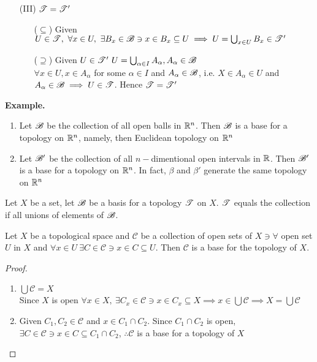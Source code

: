 \begin{enumerate}[wide]
	\item[(III)] $\mathscr{T} = \mathscr{T}'$
		\begin{enumerate}
		\item[($\subseteq$)] Given $U \in \mathscr{T},~\forall x \in U,~\exists B_x \in \mathscr{B} \ni x \in B_x \subseteq U \implies U = \bigcup_{x \in U}B_x \in \mathscr{T}'$
		\item[($\supseteq$)] Given $U \in \mathscr{T}' ~ U = \bigcup_{\alpha \in I}A_{\alpha},A_{\alpha} \in \mathscr{B}$\\
		$\forall x \in U,x \in A_{\alpha}$ for some $\alpha \in I$ and $A_{\alpha} \in \mathscr{B}$, i.e. $X \in A_{\alpha} \in U$ and $A_{\alpha} \in \mathscr{B} \implies U \in \mathscr{T}$. Hence $\mathscr{T} = \mathscr{T}'$
		\end{enumerate}
\end{enumerate}

\textbf{Example.}

\begin{enumerate}
	\item Let $\mathscr{B}$ be the collection of all open balls in $\mathbb{R}^n$. Then $\mathscr{B}$ is a base for a topology on $\mathbb{R}^n$, namely, then Euclidean topology on $\mathbb{R}^n$
	\item Let $\mathscr{B}'$ be the collection of all $n-$dimentional open intervals in $\mathbb{R}$. Then $\mathscr{B}'$ is a base for a topology on $\mathbb{R}^n$. In fact, $\beta$ and $\beta'$ generate the same topology on $\mathbb{R}^n$
\end{enumerate}

\begin{lmma*}
	Let $X$ be a set, let $\mathscr{B}$ be a basis for a topology $\mathscr{T}$ on $X$. $\mathscr{T}$ equals the collection if all unions of elements of $\mathscr{B}$.
\end{lmma*}

\begin{lmma*}
	Let $X$ be a topological space and $\mathscr{C}$ be a collection of open sets of $X \ni \forall$ open set $U$ in $X$ and $\forall x \in U ~\exists C \in \mathscr{C} \ni x \in C \subseteq U$. Then $\mathscr{C}$ is a base for the topology of $X$.
\end{lmma*}

\begin{proof}
	\begin{enumerate}
		\item $\bigcup \mathscr{C} = X$\\
		Since $X$ is open $\forall x \in X,~\exists C_x \in \mathscr{C} \ni x \in C_x \subseteq X \implies x \in \bigcup \mathscr{C} \implies X = \bigcup \mathscr{C}$
		\item Given $C_1,C_2 \in \mathscr{C}$ and $x \in C_1 \cap C_2$. Since $C_1 \cap C_2$ is open, $\exists C \in \mathscr{C} \ni x \in C \subseteq C_1 \cap C_2$, $\therefore \mathscr{C}$ is a base for a topology of $X$
	\end{enumerate}
\end{proof}

